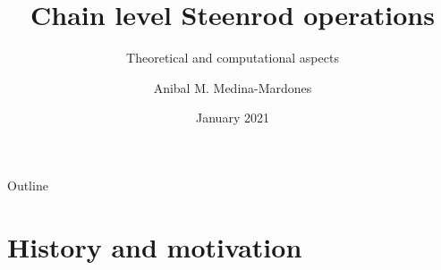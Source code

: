 \documentclass[10pt,t]{beamer}
\title[clesto]{Chain level Steenrod operations}
\subtitle{Theoretical and computational aspects}
\author[ammedmar]{Anibal M. Medina-Mardones}
\institute{Max Planck Institute for Mathematics in Bonn}
\date{January 2021}
\begin{document}

{


\begin{frame}
    \titlepage
\end{frame}
}

\begin{frame}{Outline}
	\vskip 2mm
	\hfill	{\large \parbox{.95\textwidth}{\tableofcontents[hideothersubsections]}}
\end{frame}


\section{History and motivation} \label{sec: history and motivation}
\end{document}
